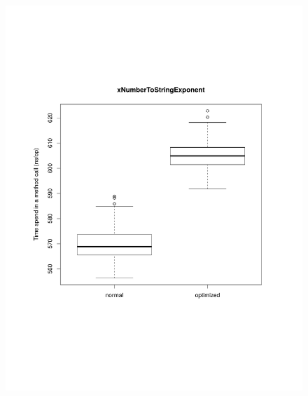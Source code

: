 \begin{figure}[H]
	\centering

	\centerline{
		\includegraphics[trim=0mm 60mm 20mm 50mm,scale=0.50]{pictures/boxplot_xNumberToStringExponent.pdf}
}
\end{figure}

